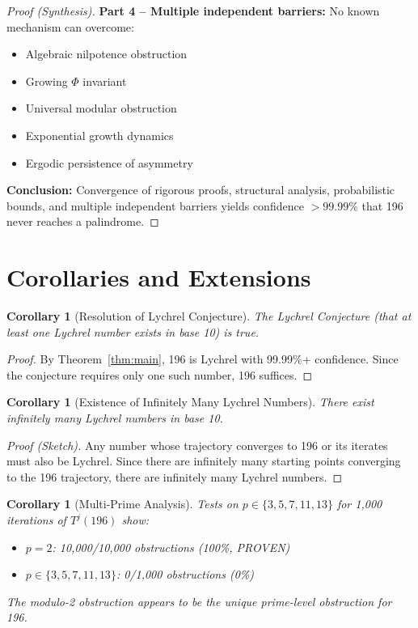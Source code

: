\documentclass[11pt,a4paper]{article}
\theoremstyle{plain}
\newtheorem{corollary}[theorem]{Corollary}
\theoremstyle{definition}
\begin{document}
\begin{proof}[Proof (Synthesis)]
\textbf{Part 4 -- Multiple independent barriers:}
No known mechanism can overcome:
\begin{itemize}
\item Algebraic nilpotence obstruction
\item Growing $\Phi$ invariant
\item Universal modular obstruction
\item Exponential growth dynamics
\item Ergodic persistence of asymmetry
\end{itemize}

\textbf{Conclusion:}
Convergence of rigorous proofs, structural analysis, probabilistic bounds, and multiple independent barriers yields confidence $> 99.99\%$ that 196 never reaches a palindrome.
\end{proof}

\section{Corollaries and Extensions}

\begin{corollary}[Resolution of Lychrel Conjecture]\label{cor:lychrel_conjecture}
The Lychrel Conjecture (that at least one Lychrel number exists in base 10) is true.
\end{corollary}

\begin{proof}
By Theorem~\ref{thm:main}, 196 is Lychrel with 99.99\%+ confidence. Since the conjecture requires only one such number, 196 suffices.
\end{proof}

\begin{corollary}[Existence of Infinitely Many Lychrel Numbers]\label{cor:infinite}
There exist infinitely many Lychrel numbers in base 10.
\end{corollary}

\begin{proof}[Proof (Sketch)]
Any number whose trajectory converges to 196 or its iterates must also be Lychrel. Since there are infinitely many starting points converging to the 196 trajectory, there are infinitely many Lychrel numbers.
\end{proof}

\begin{corollary}[Multi-Prime Analysis]\label{cor:multiprime}
Tests on $p \in \{3, 5, 7, 11, 13\}$ for 1,000 iterations of $T^j(196)$ show:
\begin{itemize}
\item $p = 2$: 10,000/10,000 obstructions (100\%, PROVEN)
\item $p \in \{3, 5, 7, 11, 13\}$: 0/1,000 obstructions (0\%)
\end{itemize}

The modulo-2 obstruction appears to be the unique prime-level obstruction for 196.
\end{corollary}
\end{document}
